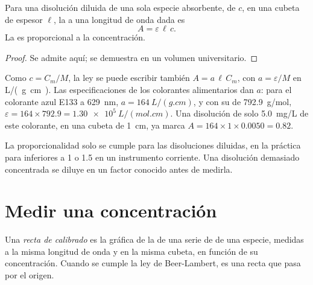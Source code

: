 \begin{proposition}\label{prop:g11:absorbance:beer-lambert}
Para una disolución diluida de una sola especie absorbente, de
 $c$, en una cubeta de espesor $\ell$, la 
a una longitud de onda dada es
\[
  A = \varepsilon\, \ell\, c .
\]
La  es proporcional a la concentración.
\end{proposition}

\begin{proof}
Se admite aquí; se demuestra en un volumen universitario.
\end{proof}


\begin{remark}\label{rem:g11:absorbance:mass}
Como $c = C_m / M$, la ley se puede escribir también $A = a\, \ell\, C_m$,
con $a = \varepsilon / M$ en \si{L/(g.cm)}. Las especificaciones de los
colorantes alimentarios dan $a$: para el colorante azul E133 a
\qty{629}{nm}, $a =
\qty{164}{L/(g.cm)}$, y con su  de
\qty{792.9}{g/mol}, $\varepsilon = 164 \times 792.9 = \qty{1.30e5}{L/(mol.cm)}$.
Una disolución de solo \qty{5.0}{mg/L} de este colorante, en una cubeta
de \qty{1}{cm}, ya marca
$A = 164 \times 1 \times 0.0050 = 0.82$.
\end{remark}

\begin{remark}\label{rem:g11:absorbance:dilute}
La proporcionalidad solo se cumple para las disoluciones diluidas, en la
práctica para  inferiores a 1 o 1.5 en un instrumento
corriente. Una disolución demasiado concentrada se diluye en un factor
conocido antes de medirla.
\end{remark}

\section{Medir una concentración}

\begin{definition}\label{def:g11:absorbance:calibration-line}
Una \emph{recta de calibrado} es la gráfica de
la  de una serie de  de una especie,
medidas a la misma longitud de onda y en la misma cubeta, en función de
su concentración. Cuando se cumple la ley de Beer-Lambert, es una recta
que pasa por el origen.
\end{definition}

